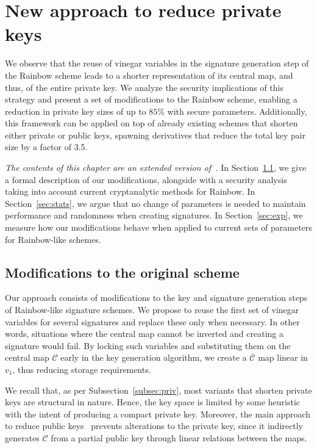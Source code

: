 \documentclass[12pt, a4paper, oneside]{memoir}
\theoremstyle{definition}
\begin{document}
\chapter{New approach to reduce private keys}\label{ch:eta}

We observe that the reuse of vinegar variables in the signature generation step of the Rainbow scheme leads to a shorter representation of its central map, and thus, of the entire private key. We analyze the security implications of this strategy and present a set of modifications to the Rainbow scheme, enabling a reduction in private key sizes of up to $85\%$ with secure parameters. Additionally, this framework can be applied on top of already existing schemes that shorten either private or public keys, spawning derivatives that reduce the total key pair size by a factor of 3.5. 

\emph{The contents of this chapter are an extended version of~\cite{Zambonin:201907}.} In Section~\ref{sec:mod}, we give a formal description of our modifications, alongside with a security analysis taking into account current cryptanalytic methods for Rainbow. In Section~\ref{sec:stats}, we argue that no change of parameters is needed to maintain performance and randomness when creating signatures. In Section~\ref{sec:exp}, we measure how our modifications behave when applied to current sets of parameters for Rainbow-like schemes.

\section{Modifications to the original scheme}\label{sec:mod}

Our approach consists of modifications to the key and signature generation steps of Rainbow-like signature schemes. We propose to reuse the first set of vinegar variables for several signatures and replace these only when necessary. In other words, situations where the central map cannot be inverted and creating a signature would fail. By locking such variables and substituting them on the central map $\mathcal{C}$ early in the key generation algorithm, we create a $\overline{\mathcal{C}}$ map linear in $v_{1}$, thus reducing storage requirements. 

We recall that, as per Subsection~\ref{subsec:priv}, most variants that shorten private keys are structural in nature. Hence, the key space is limited by some heuristic with the intent of producing a compact private key. Moreover, the main approach to reduce public keys~\cite{Petzoldt:201307} prevents alterations to the private key, since it indirectly generates $\mathcal{C}$ from a partial public key through linear relations between the maps. 
\end{document}
